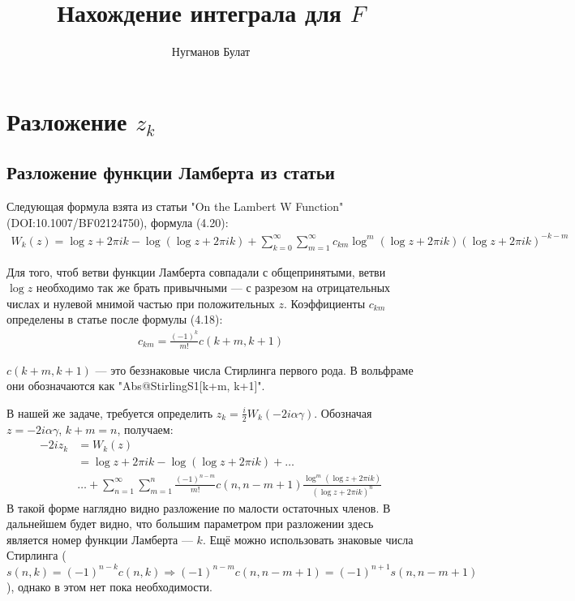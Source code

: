 \documentclass[a4paper, 12pt]{article}
\author{Нугманов Булат}
\title{Нахождение интеграла для $F$}
\begin{document}
\maketitle
\section*{Разложение $z_k$}
\subsection*{Разложение функции Ламберта из статьи}
Следующая формула взята из статьи "On the Lambert W Function"(DOI:10.1007/BF02124750), формула (4.20):
\begin{equation}
\begin{aligned}
    W_k(z) = \log z + 2\pi i k - \log\left(\log z + 2\pi i k\right) + \sum\limits_{k=0}^{\infty}\sum\limits_{m=1}^{\infty} c_{km}\log^m\left(\log z + 2\pi i k\right)\left(\log z + 2\pi i k \right)^{-k-m}
\end{aligned}
\end{equation}

Для того, чтоб ветви функции Ламберта совпадали с общепринятыми, ветви $\log z$ необходимо так же брать привычными --- с разрезом на отрицательных числах и нулевой мнимой частью при положительных $z$. Коэффициенты $c_{km}$ определены в статье после формулы (4.18):
\begin{equation}
\begin{aligned}
    c_{km} = \frac{(-1)^k}{m!} c(k+m, k+1)
\end{aligned}
\end{equation}

$c(k+m, k+1)$ --- это беззнаковые числа Стирлинга первого рода. В вольфраме они обозначаются как "Abs@StirlingS1[k+m, k+1]".

В нашей же задаче, требуется определить $z_k = \frac{i}{2}W_k(-2i\alpha\gamma)$. Обозначая $z=-2i\alpha\gamma$, $k+m=n$, получаем:
\begin{equation}
\begin{aligned}
    -2iz_k &= W_k(z) \\
    &= \log z + 2\pi i k - \log\left(\log z + 2\pi i k\right) + \dots \\
    &\dots + \sum\limits_{n=1}^{\infty}\sum\limits_{m=1}^{n} 
    \frac{(-1)^{n-m}}{m!} c(n, n-m+1)\frac{\log^{m}\left(\log z + 2\pi i k\right)}{\left(\log z + 2\pi i k\right)^n}
\end{aligned}
\end{equation}
В такой форме наглядно видно разложение по малости остаточных членов. В дальнейшем будет видно, что большим параметром при разложении здесь является номер функции Ламберта --- $k$. Ещё можно использовать знаковые числа Стирлинга ($s(n, k) = (-1)^{n-k}c(n, k) \Rightarrow (-1)^{n-m} c(n, n-m+1) = (-1)^{n+1} s(n, n-m+1)$), однако в этом нет пока необходимости.
\end{document}

